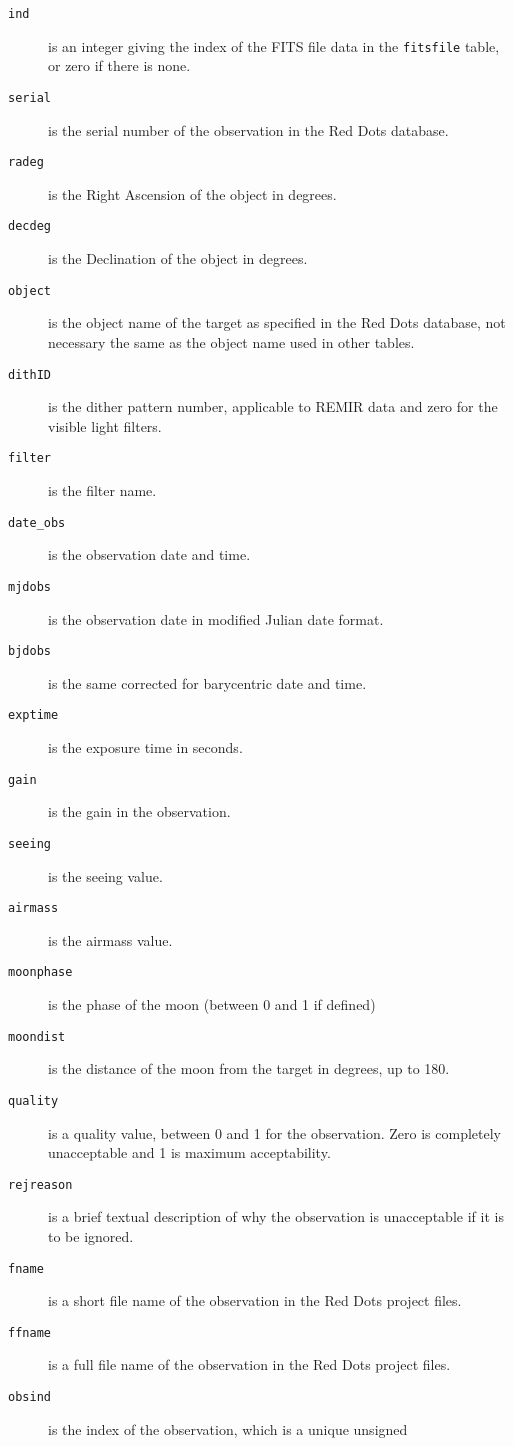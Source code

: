 \begin{description}
\item[\tt ind] is an integer giving the index of the FITS file data in the
\texttt{fitsfile} table, or zero if there is none.
\item[\tt serial] is the serial number of the observation in the Red Dots
database.
\item[\tt radeg] is the Right Ascension of the object in degrees.
\item[\tt decdeg] is the Declination of the object in degrees.
\item[\tt object] is the object name of the target as specified in the Red Dots
database, not necessary the same as the object name used in other tables.
\item[\tt dithID] is the dither pattern number, applicable to REMIR data and zero
for the visible light filters.
\item[\tt filter] is the filter name.
\item[\tt date\_obs] is the observation date and time.
\item[\tt mjdobs] is the observation date in modified Julian date format.
\item[\tt bjdobs] is the same corrected for barycentric date and time.
\item[\tt exptime] is the exposure time in seconds.
\item[\tt gain] is the gain in the observation.
\item[\tt seeing] is the seeing value.
\item[\tt airmass] is the airmass value.
\item[\tt moonphase] is the phase of the moon (between 0 and 1 if defined)
\item[\tt moondist] is the distance of the moon from the target in degrees, up to
180.
\item[\tt quality] is a quality value, between 0 and 1 for the observation. Zero is
completely unacceptable and 1 is maximum acceptability.
\item[\tt rejreason] is a brief textual description of why the observation is
unacceptable if it is to be ignored.
\item[\tt \tt fname] is a short file name of the observation in the Red Dots
project files.
\item[\tt \tt ffname] is a full file name of the observation in the Red Dots project
files.
\item[\tt obsind] is the index of the observation, which is a unique unsigned

\end{description}
